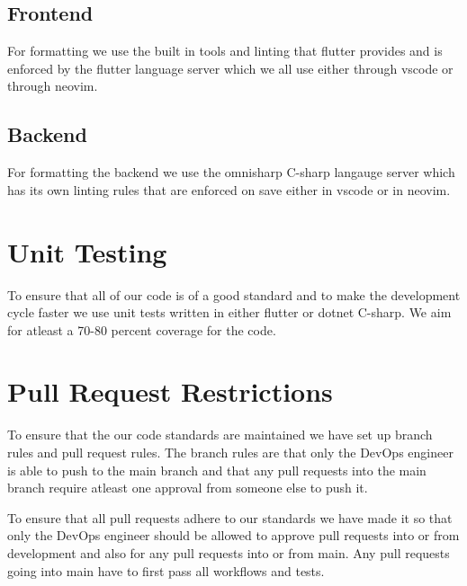 \documentclass{article}
\begin{document}
\subsection{Frontend}

For formatting we use the built in tools and linting that flutter provides and is enforced by the flutter language server
which we all use either through vscode or through neovim.

\subsection{Backend}

For formatting the backend we use the omnisharp C-sharp langauge server which has its own linting rules that are enforced on save
either in vscode or in neovim.

\section{Unit Testing}

To ensure that all of our code is of a good standard and to make the development cycle faster we use unit tests written
in either flutter or dotnet C-sharp. We aim for atleast a 70-80 percent coverage for the code.

\section{Pull Request Restrictions}

To ensure that the our code standards are maintained we have set up branch rules and pull request rules. The branch rules 
are that only the DevOps engineer is able to push to the main branch and that any pull requests into the main branch require
atleast one approval from someone else to push it. 

To ensure that all pull requests adhere to our standards we have made it so that only the DevOps engineer should be allowed to 
approve pull requests into or from development and also for any pull requests into or from main. Any pull requests going into 
main have to first pass all workflows and tests.
\end{document}
